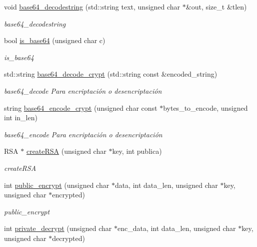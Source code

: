 \begin{DoxyCompactItemize}
void \hyperlink{classTemplateAFIS__webservice_aab3e90fdea004b744610ab0ec12147b0}{base64\+\_\+decodestring} (std\+::string text, unsigned char $\ast$\&out, size\+\_\+t \&tlen)
\begin{DoxyCompactList}\small\item\em base64\+\_\+decodestring \end{DoxyCompactList}\item 
bool \hyperlink{classTemplateAFIS__webservice_a1fb45563a560d59202d2d051fa649798}{is\+\_\+base64} (unsigned char c)
\begin{DoxyCompactList}\small\item\em is\+\_\+base64 \end{DoxyCompactList}\item 
std\+::string \hyperlink{classTemplateAFIS__webservice_aba3daf9219a01536921126e56003c9e0}{base64\+\_\+decode\+\_\+crypt} (std\+::string const \&encoded\+\_\+string)
\begin{DoxyCompactList}\small\item\em base64\+\_\+decode Para encriptación o desencriptación \end{DoxyCompactList}\item 
string \hyperlink{classTemplateAFIS__webservice_ab2f8808e62b3917c8530d121feaf71b8}{base64\+\_\+encode\+\_\+crypt} (unsigned char const $\ast$bytes\+\_\+to\+\_\+encode, unsigned int in\+\_\+len)
\begin{DoxyCompactList}\small\item\em base64\+\_\+encode Para encriptación o desencriptación \end{DoxyCompactList}\item 
R\+SA $\ast$ \hyperlink{classTemplateAFIS__webservice_a5cf955ee6d8a2cca9fa1116906440f41}{create\+R\+SA} (unsigned char $\ast$key, int publica)
\begin{DoxyCompactList}\small\item\em create\+R\+SA \end{DoxyCompactList}\item 
int \hyperlink{classTemplateAFIS__webservice_ac758d0e51ad6676b2bd2659d4438ae35}{public\+\_\+encrypt} (unsigned char $\ast$data, int data\+\_\+len, unsigned char $\ast$key, unsigned char $\ast$encrypted)
\begin{DoxyCompactList}\small\item\em public\+\_\+encrypt \end{DoxyCompactList}\item 
int \hyperlink{classTemplateAFIS__webservice_ae94ac0d97d82afb530698db6f22c0a71}{private\+\_\+decrypt} (unsigned char $\ast$enc\+\_\+data, int data\+\_\+len, unsigned char $\ast$key, unsigned char $\ast$decrypted)

\end{DoxyCompactItemize}
